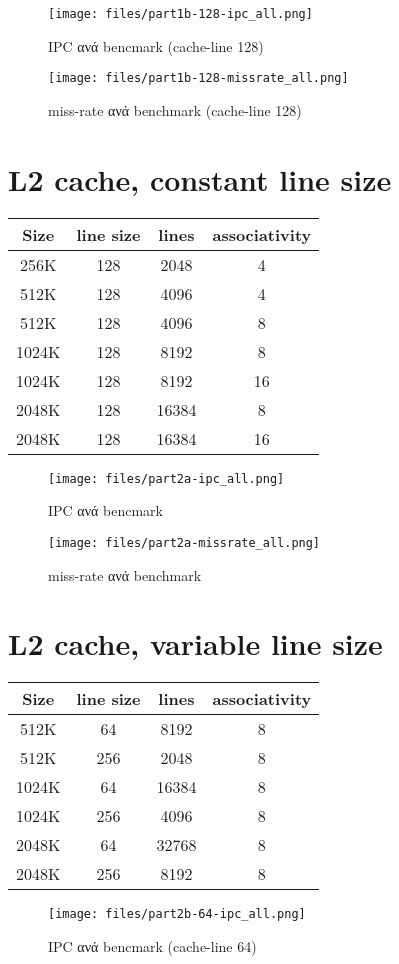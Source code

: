 \documentclass[a4paper,9pt]{article}
\begin{document}
\begin{figure}[H]
    \texttt{[image: files/part1b-128-ipc\_all.png]}
    \caption{IPC ανά bencmark (cache-line 128)}
\end{figure}
\begin{figure}[H]
    \texttt{[image: files/part1b-128-missrate\_all.png]}
    \caption{miss-rate ανά benchmark (cache-line 128)}
\end{figure}


\section{L2 cache, constant line size}
\begin{tabular}{c c c c}
    Size & line size & lines & associativity\\ 
    \hline
    \hline
    256K   & 128 & 2048  & 4\\
    \hline
    512K   & 128 & 4096  & 4\\
    512K   & 128 & 4096  & 8\\
    \hline
    1024K  & 128 & 8192  & 8\\
    1024K  & 128 & 8192  & 16\\
    \hline
    2048K  & 128 & 16384 & 8\\
    2048K  & 128 & 16384 & 16\\
\end{tabular}
\begin{figure}[H]
    \texttt{[image: files/part2a-ipc\_all.png]}
    \caption{IPC ανά bencmark}
\end{figure}

\begin{figure}[H]
    \texttt{[image: files/part2a-missrate\_all.png]}
    \caption{miss-rate ανά benchmark}
\end{figure}

\section{L2 cache, variable line size}
\begin{tabular}{c c c c}
    Size & line size & lines & associativity\\ 
    \hline
    \hline
    512K   & 64  & 8192  & 8\\
    512K   & 256 & 2048  & 8\\
    \hline
    1024K  & 64  & 16384 & 8\\
    1024K  & 256 & 4096  & 8\\
    \hline
    2048K  & 64  & 32768 & 8\\
    2048K  & 256 & 8192  & 8\\
\end{tabular}
\begin{figure}[H]
    \texttt{[image: files/part2b-64-ipc\_all.png]}
    \caption{IPC ανά bencmark (cache-line 64)}
\end{figure}
\end{document}
